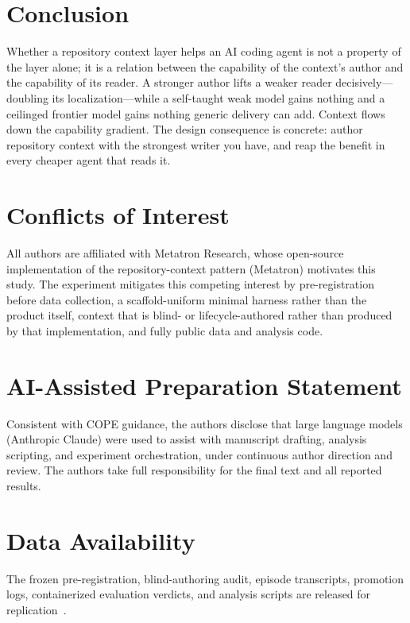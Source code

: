 \documentclass[sigconf,nonacm]{acmart}
\begin{document}
\section{Conclusion}
Whether a repository context layer helps an AI coding agent is not a property of
the layer alone; it is a relation between the capability of the context's author
and the capability of its reader. A stronger author lifts a weaker reader
decisively---doubling its localization---while a self-taught weak model gains
nothing and a ceilinged frontier model gains nothing generic delivery can add.
Context flows down the capability gradient. The design consequence is concrete:
author repository context with the strongest writer you have, and reap the
benefit in every cheaper agent that reads it.

\section*{Conflicts of Interest}
All authors are affiliated with Metatron Research, whose open-source
implementation of the repository-context pattern (Metatron) motivates this study.
The experiment mitigates this competing interest by pre-registration before data
collection, a scaffold-uniform minimal harness rather than the product itself,
context that is blind- or lifecycle-authored rather than produced by that
implementation, and fully public data and analysis code.

\section*{AI-Assisted Preparation Statement}
Consistent with COPE guidance, the authors disclose that large language models
(Anthropic Claude) were used to assist with manuscript drafting, analysis
scripting, and experiment orchestration, under continuous author direction and
review. The authors take full responsibility for the final text and all reported
results.

\section*{Data Availability}
The frozen pre-registration, blind-authoring audit, episode transcripts,
promotion logs, containerized evaluation verdicts, and analysis scripts are
released for replication~\cite{artifact}.
\end{document}
